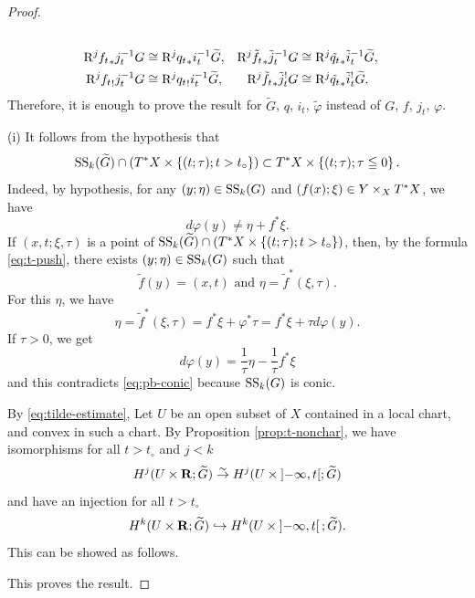 \begin{proof}
\begin{align*}
    \\
    \Rder[j]{{f_{t}}_{\ast}}j_{t}^{-1}G
    &\cong 
    \Rder[j]{{q_{t}}_{\ast}}i_{t}^{-1}\widetilde{G},
    &
    \Rder[j]{\tilde{f_{t}}_{\ast}}\tilde{j}_{t}^{-1}G
    &\cong 
    \Rder[j]{\tilde{q_{t}}_{\ast}}\tilde{i}_{t}^{-1}\widetilde{G},
    \\
    \Rder[j]{{f_{t}}_{!}}j_{t}^{-1}G
    &\cong 
    \Rder[j]{{q_{t}}_{!}}i_{t}^{-1}\widetilde{G},
    &
    \Rder[j]{\tilde{f_{t}}_{\ast}}\tilde{j}_{t}^{!}G
    &\cong 
    \Rder[j]{\tilde{q_{t}}_{\ast}}\tilde{i}_{t}^{!}\widetilde{G}.    
  \end{align*}
  Therefore, it is enough to prove the result for \(\widetilde{G}\), \(q\), \(i_t\), \(\tilde{\varphi}\) instead of \(G\), \(f\), \(j_t\), \(\varphi\). 

  (i) 
  It follows from the hypothesis that\begin{equation}\label{eq:tilde-estimate}
    \muS[k](\widetilde{G})\cap\left(
      \cotb[X]\times\left\{(t;\tau);t>t_{\circ}\right\}
    \right)
    \subset
    \cotb[X]\times\left\{(t;\tau);\tau\leqq0\right\}.
  \end{equation}
  Indeed, by hypothesis, 
  for any \((y;\eta)\in\muS[k](G)\) 
  and \((f(x);\xi)\in Y\tpb[X]\cotb[X]\), 
  we have \begin{equation}\label{eq:pb-conic}
    d\varphi(y)\neq \eta + f^{\ast}\xi.
  \end{equation}
  If \((x,t;\xi,\tau)\) is a point of \(
    \muS[k](\widetilde{G})\cap\left(
      \cotb[X]\times\left\{(t;\tau);t>t_{\circ}\right\}
  \right)\), 
  then, by the formula \eqref{eq:t-push}, 
  there exists \((y;\eta)\in\muS[k](G)\) such that \[
    \tilde{f}(y)=(x,t) 
    \text{ and } 
    \eta=\tilde{f}^{\ast}(\xi,\tau).
  \] For this \(\eta\), we have \[
    \eta
    =\tilde{f}^{\ast}(\xi,\tau)
    =f^{\ast}\xi +\varphi^{\ast}\tau
    =f^{\ast}\xi +\tau d\varphi(y).
  \]
  If \(\tau>0\), we get \[
    d\varphi(y)=\frac{1}{\tau}\eta-\frac{1}{\tau}f^{\ast}\xi
  \] and this contradicts \eqref{eq:pb-conic} 
  because \(\muS[k](G)\) is conic. 

  By \eqref{eq:tilde-estimate}, 
  Let \(U\) be an open subset of \(X\) contained 
  in a local chart, and convex in such a chart. 
  By Proposition \ref{prop:t-nonchar}, we have isomorphisms 
  for all \(t>t_{\circ}\) and \(j<k\)
  \begin{equation}
    H^{j}(U\times\rr;\widetilde{G})
    \simar
    H^{j}(U\times\lopen-\infty,t\ropen;\widetilde{G})
  \end{equation}
  and have an injection 
  for all \(t>t_{\circ}\) 
  \begin{equation}
    H^{k}(U\times\rr;\widetilde{G})
    \hookrightarrow
    H^{k}(U\times\left]-\infty,t\right[;\widetilde{G}).
  \end{equation}
  This can be showed as follows.

  This proves the result. 
\end{proof}

